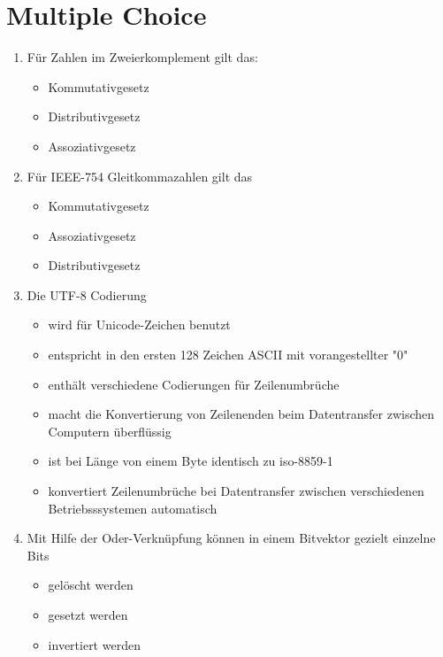 \documentclass{exercisesheet}
\begin{document}
\section*{Multiple Choice}\label{sec:mc} %
\begin{enumerate}
  \item Für Zahlen im Zweierkomplement gilt das:
        \begin{itemize}
          \item Kommutativgesetz \checkmark
          \item Distributivgesetz \checkmark
          \item Assoziativgesetz \checkmark
        \end{itemize}
  \item Für IEEE-754 Gleitkommazahlen gilt das
        \begin{itemize}
          \item Kommutativgesetz \checkmark
          \item Assoziativgesetz
          \item Distributivgesetz
        \end{itemize}
  \item Die UTF-8 Codierung
        \begin{itemize}
          \item wird für Unicode-Zeichen benutzt \checkmark
          \item entspricht in den ersten 128 Zeichen ASCII mit vorangestellter "0" \checkmark
          \item enthält verschiedene Codierungen für Zeilenumbrüche \checkmark
          \item macht die Konvertierung von Zeilenenden beim Datentransfer zwischen Computern überflüssig
          \item ist bei Länge von einem Byte identisch zu iso-8859-1 \checkmark
          \item konvertiert Zeilenumbrüche bei Datentransfer zwischen verschiedenen Betriebsssystemen automatisch
        \end{itemize}
  \item Mit Hilfe der Oder-Verknüpfung können in einem Bitvektor gezielt einzelne Bits
        \begin{itemize}
          \item gelöscht werden
          \item gesetzt werden \checkmark
          \item invertiert werden

\end{itemize}
\end{enumerate}
\end{document}
